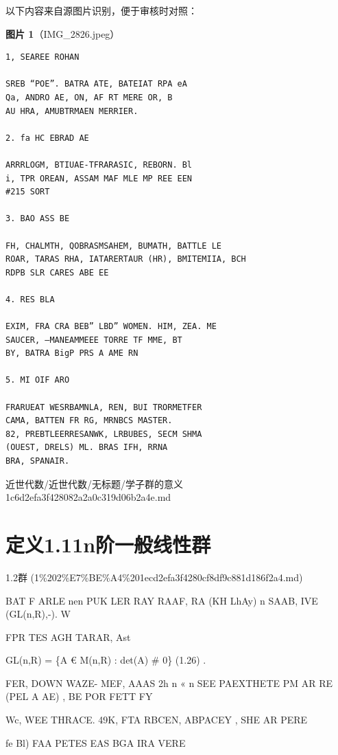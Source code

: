 \begin{note}
以下内容来自源图片识别，便于审核时对照：

\textbf{图片 1}（IMG\_2826.jpeg）
\begin{Verbatim}[fontsize=\small]
1, SEAREE ROHAN

SREB “POE”. BATRA ATE, BATEIAT RPA eA
Qa, ANDRO AE, ON, AF RT MERE OR, B
AU HRA, AMUBTRMAEN MERRIER.

2. fa HC EBRAD AE

ARRRLOGM, BTIUAE-TFRARASIC, REBORN. Bl
i, TPR OREAN, ASSAM MAF MLE MP REE EEN
#215 SORT

3. BAO ASS BE

FH, CHALMTH, QOBRASMSAHEM, BUMATH, BATTLE LE
ROAR, TARAS RHA, IATARERTAUR (HR), BMITEMIIA, BCH
RDPB SLR CARES ABE EE

4. RES BLA

EXIM, FRA CRA BEB” LBD” WOMEN. HIM, ZEA. ME
SAUCER, —MANEAMMEEE TORRE TF MME, BT
BY, BATRA BigP PRS A AME RN

5. MI OIF ARO

FRARUEAT WESRBAMNLA, REN, BUI TRORMETFER
CAMA, BATTEN FR RG, MRNBCS MASTER.
82, PREBTLEERRESANWK, LRBUBES, SECM SHMA
(OUEST, DRELS) ML. BRAS IFH, RRNA
BRA, SPANAIR.
\end{Verbatim}

\end{note}

\begin{note}[来源路径]

近世代数/近世代数/无标题/学子群的意义 1c6d2efa3f428082a2a0c319d06b2a4e.md

\end{note}

\section*{定义1.11n阶一般线性群}

\begin{note}[来源上级主题]

1.2群 (1\%202\%E7\%BE\%A4\%201ecd2efa3f4280cf8df9c881d186f2a4.md)

\end{note}

\begin{definition}[定义1.11n阶一般线性群]

BAT F ARLE nen PUK LER RAY RAAF, RA (KH LhAy) n SAAB, IVE (GL(n,R),-). W

FPR TES AGH TARAR, Ast

GL(n,R) = \{A € M(n,R) : det(A) \# 0\}                               (1.26)  .

FER, DOWN WAZE- MEF, AAAS 2h n « n SEE PAEXTHETE PM AR RE (PEL A AE) , BE POR FETT FY

Wc, WEE THRACE. 49K, FTA RBCEN, ABPACEY , SHE AR PERE

fe Bl) FAA PETES EAS BGA IRA VERE

\end{definition}

